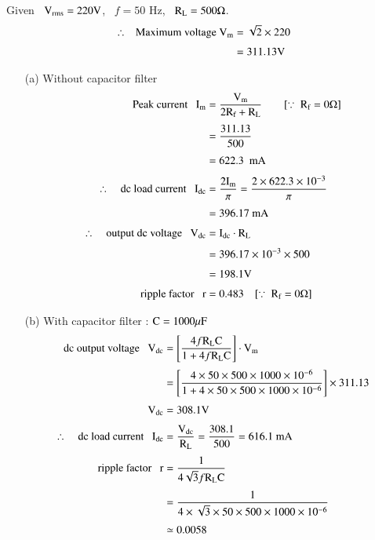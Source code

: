 \begin{solution}
Given \ $\textrm{V}_{\text{rms}}=220\textrm{V}$, \ $f=50$ Hz, \ $\textrm{R}_{\textrm{L}}=500\Omega$.
\begin{align*}
\therefore ~ \text{~ Maximum voltage } \textrm{V}_{\textrm{m}} &= \sqrt{2}\times 220\\[3pt]
          &= 311.13\textrm{V}
\end{align*}
\begin{itemize}
\item[(a)] Without capacitor filter
\begin{align*}
\text{Peak current~~ } \rmI_{\rmm} &= \frac{\rmV_{\rmm}}{2\rmR_{\rmf}+\rmR_{\rmL}}\qquad [\because \ \rmR_{\rmf}=0\Omega]\\[3pt]
&= \frac{311.13}{500}\\[3pt]
&= 622.3\text{~ mA}\\[3pt]
\therefore\quad \text{dc load current~~ } \rmI_{\text{dc}} &= \frac{2\rmI_{\rmm}}{\pi}=\dfrac{2\times 622.3\times 10^{-3}}{\pi}\\[3pt]
&= 396.17\text{~mA}\\[3pt]
\therefore\quad \text{output dc voltage~~ } \rmV_{\text{dc}} &= \rmI_{\text{dc}}\cdot \rmR_{\rmL}\\[3pt]
&= 396.17\times 10^{-3}\times 500\\[3pt]
&= 198.1\rmV\\[3pt]
\text{ripple factor~~ } \rmr &= 0.483\quad [\because \ \rmR_{\rmf}=0\Omega]
\end{align*}

\item[(b)] With capacitor filter : $\textrm{C}=1000\mu\textrm{F}$
\begin{align*}
\text{dc output voltage~~ } \textrm{V}_{\text{dc}} &= \left[\frac{4f\textrm{R}_{\textrm{L}}\textrm{C}}{1+4f\textrm{R}_{\textrm{L}}\textrm{C}}\right]\cdot \textrm{V}_{\textrm{m}}\\[3pt]
&= \left[\frac{4\times 50\times 500\times 1000\times 10^{-6}}{1+4\times 50\times 500\times 1000\times 10^{-6}}\right]\times 311.13\\[3pt]
\textrm{V}_{\text{dc}} &= 308.1\textrm{V}\\[3pt]
\therefore\quad \text{dc load current~~ } \textrm{I}_{\text{dc}} &= \frac{\textrm{V}_{\text{dc}}}{\textrm{R}_{\textrm{L}}}=\dfrac{308.1}{500}=616.1\text{~mA}\\[3pt]
\text{ripple factor~~ } \textrm{r} &= \frac{1}{4\sqrt{3}f\textrm{R}_{\textrm{L}}\textrm{C}}\\[3pt]
&= \frac{1}{4\times \sqrt{3}\times 50\times 500\times 1000\times 10^{-6}}\\[3pt]
&\simeq 0.0058
\end{align*}
\end{itemize}
\end{solution}

